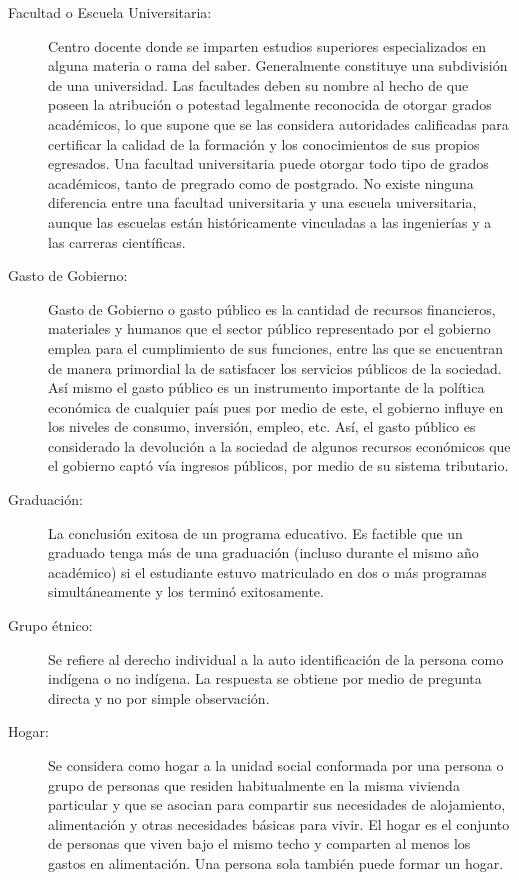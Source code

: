 \begin{description}
\item[Facultad o Escuela Universitaria: ] Centro docente donde se imparten estudios superiores especializados en alguna materia o rama del saber. Generalmente constituye una subdivisión de una universidad. Las facultades deben su nombre al hecho de que poseen la atribución o potestad legalmente reconocida de otorgar grados académicos, lo que supone que se las considera autoridades calificadas para certificar la calidad de la formación y los conocimientos de sus propios egresados. Una facultad universitaria puede otorgar todo tipo de grados académicos, tanto de pregrado como de postgrado. No existe ninguna diferencia entre una facultad universitaria y una escuela universitaria, aunque las escuelas están históricamente vinculadas a las ingenierías y a las carreras científicas.
\item[Gasto de Gobierno: ] Gasto de Gobierno o gasto público es la cantidad de recursos financieros, materiales y humanos que el sector público representado por el gobierno emplea para el cumplimiento de sus funciones, entre las que se encuentran de manera primordial la de satisfacer los servicios públicos de la sociedad. Así mismo el gasto público es un instrumento importante de la política económica de cualquier país pues por medio de este, el gobierno influye en los niveles de consumo, inversión, empleo, etc. Así, el gasto público es considerado la devolución a la sociedad de algunos recursos económicos que el gobierno captó vía ingresos públicos, por medio de su sistema tributario.
\item[Graduación: ] La conclusión exitosa de un programa educativo. Es factible que un graduado tenga más de una graduación (incluso durante el mismo año académico) si el estudiante estuvo matriculado en dos o más programas simultáneamente y los terminó exitosamente.
\item[Grupo étnico: ] Se refiere al derecho individual a la auto identificación de la persona como indígena o no indígena. La respuesta se obtiene por medio de pregunta directa y no por simple observación.
\item[Hogar: 	 ] Se considera como hogar a la unidad social conformada por una persona o grupo de personas que residen habitualmente en la misma vivienda particular y que se asocian para compartir sus necesidades de alojamiento, alimentación y otras necesidades básicas para vivir. El hogar es el conjunto de personas que viven bajo el mismo techo y comparten al menos los gastos en alimentación. Una persona sola también puede formar un hogar.

\end{description}
